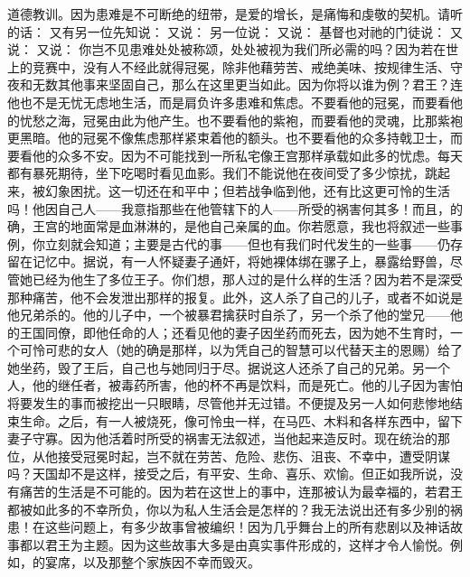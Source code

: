 道德教训。因为患难是不可断绝的纽带，是爱的增长，是痛悔和虔敬的契机。请听的话： 又有另一位先知说： 又说： 另一位说： 又说： 基督也对祂的门徒说： 又说： 又说： 你岂不见患难处处被称颂，处处被视为我们所必需的吗？因为若在世上的竞赛中，没有人不经此就得冠冕，除非他藉劳苦、戒绝美味、按规律生活、守夜和无数其他事来坚固自己，那么在这里更当如此。因为你将以谁为例？君王？连他也不是无忧无虑地生活，而是肩负许多患难和焦虑。不要看他的冠冕，而要看他的忧愁之海，冠冕由此为他产生。也不要看他的紫袍，而要看他的灵魂，比那紫袍更黑暗。他的冠冕不像焦虑那样紧束着他的额头。也不要看他的众多持戟卫士，而要看他的众多不安。因为不可能找到一所私宅像王宫那样承载如此多的忧虑。每天都有暴死期待，坐下吃喝时看见血影。我们不能说他在夜间受了多少惊扰，跳起来，被幻象困扰。这一切还在和平中；但若战争临到他，还有比这更可怜的生活吗！他因自己人——我意指那些在他管辖下的人——所受的祸害何其多！而且，的确，王宫的地面常是血淋淋的，是他自己亲属的血。你若愿意，我也将叙述一些事例，你立刻就会知道；主要是古代的事——但也有我们时代发生的一些事——仍存留在记忆中。据说，有一人怀疑妻子通奸，将她裸体绑在骡子上，暴露给野兽，尽管她已经为他生了多位王子。你们想，那人过的是什么样的生活？因为若不是深受那种痛苦，他不会发泄出那样的报复。此外，这人杀了自己的儿子，或者不如说是他兄弟杀的。他的儿子中，一个被暴君擒获时自杀了，另一个杀了他的堂兄——他的王国同僚，即他任命的人；还看见他的妻子因坐药而死去，因为她不生育时，一个可怜可悲的女人（她的确是那样，以为凭自己的智慧可以代替天主的恩赐）给了她坐药，毁了王后，自己也与她同归于尽。据说这人还杀了自己的兄弟。另一个人，他的继任者，被毒药所害，他的杯不再是饮料，而是死亡。他的儿子因为害怕将要发生的事而被挖出一只眼睛，尽管他并无过错。不便提及另一人如何悲惨地结束生命。之后，有一人被烧死，像可怜虫一样，在马匹、木料和各样东西中，留下妻子守寡。因为他活着时所受的祸害无法叙述，当他起来造反时。现在统治的那位，从他接受冠冕时起，岂不就在劳苦、危险、悲伤、沮丧、不幸中，遭受阴谋吗？天国却不是这样，接受之后，有平安、生命、喜乐、欢愉。但正如我所说，没有痛苦的生活是不可能的。因为若在这世上的事中，连那被认为最幸福的，若君王都被如此多的不幸所负，你以为私人生活会是怎样的？我无法说出还有多少别的祸患！在这些问题上，有多少故事曾被编织！因为几乎舞台上的所有悲剧以及神话故事都以君王为主题。因为这些故事大多是由真实事件形成的，这样才令人愉悦。例如，的宴席，以及那整个家族因不幸而毁灭。\par

